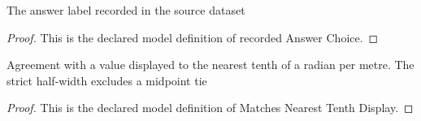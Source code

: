 \begin{definition}
  \label{def:physics:phyx-mini-0309:phyxminiproblems-problemphyxmini0309-recordedanswerchoice}
  The answer label recorded in the source dataset
\end{definition}
\begin{proof}
  This is the declared model definition of recorded Answer Choice.
\end{proof}
\begin{definition}
  \label{def:physics:phyx-mini-0309:phyxminiproblems-problemphyxmini0309-matchesnearesttenthdisplay}
  Agreement with a value displayed to the nearest tenth of a radian per metre. The strict half-width excludes a midpoint tie
\end{definition}
\begin{proof}
  This is the declared model definition of Matches Nearest Tenth Display.
\end{proof}
